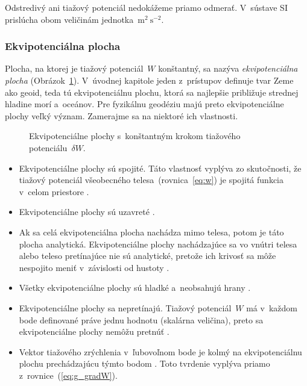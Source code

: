 \documentclass[a4paper,12pt]{book}
\begin{document}
Odstredivý ani tiažový potenciál nedokážeme priamo odmerať.  V~sústave SI 
prislúcha obom veličinám jednotka~$\mathrm{m}^2 \ \mathrm{s}^{-2}$.

\subsubsection{Ekvipotenciálna plocha}
\label{sec:equipotential_surface}

Plocha, na ktorej je tiažový potenciál~$W$ konštantný, sa nazýva 
\emph{ekvipotenciálna plocha} (Obrázok~\ref{fig:equipotential_surfaces}).  
V~úvodnej kapitole jeden z~prístupov definuje tvar Zeme ako geoid, teda tú 
ekvipotenciálnu plochu, ktorá sa najlepšie približuje strednej hladine morí 
a~oceánov.  Pre fyzikálnu geodéziu majú preto ekvipotenciálne plochy veľký 
význam.  Zamerajme sa na niektoré ich vlastnosti.

\begin{figure}
\centering

\caption{Ekvipotenciálne plochy s~konštantným krokom tiažového 
potenciálu~$\delta W$.}
\label{fig:equipotential_surfaces}
\end{figure}

\begin{itemize}
\item Ekvipotenciálne plochy sú spojité.  Táto vlastnosť vyplýva zo
skutočnosti, že tiažový potenciál všeobecného telesa~(rovnica~\ref{eq:w}) je 
spojitá funkcia v~celom priestore \parencite{MoritzPhysicalGeodesy}.

\item Ekvipotenciálne plochy sú uzavreté \parencite{VanicekGeodesy}.

\item Ak sa celá ekvipotenciálna plocha nachádza mimo telesa, potom je táto 
plocha analytická.  Ekvipotenciálne plochy nachádzajúce sa vo vnútri telesa 
alebo teleso pretínajúce nie sú analytické, pretože ich krivosť sa môže 
nespojito meniť v~závislosti od hustoty \parencite{MoritzPhysicalGeodesy}.

\item Všetky ekvipotenciálne plochy sú hladké a~neobsahujú hrany
\parencite{MoritzPhysicalGeodesy}.

\item Ekvipotenciálne plochy sa nepretínajú.  Tiažový potenciál~$W$ má v~každom 
bode definované práve jednu hodnotu (skalárna veličina), preto sa 
ekvipotenciálne plochy nemôžu pretnúť \parencite{MacMillan1930}.

\item Vektor tiažového zrýchlenia v~ľubovoľnom bode je kolmý na ekvipotenciálnu
plochu prechádzajúcu týmto bodom \parencite{MoritzPhysicalGeodesy}.  Toto 
tvrdenie vyplýva priamo z~rovnice~(\ref{eq:g_gradW}).
\end{itemize}
\end{document}
